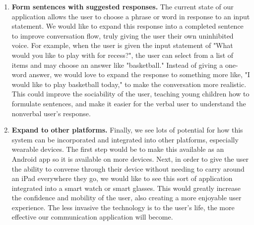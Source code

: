 \begin{enumerate}
	\item \textbf{Form sentences with suggested responses.} The current state of our application allows the user to choose a phrase or word in response to an input statement. We would like to expand this response into a completed sentence to improve conversation flow, truly giving the user their own uninhibited voice. For example, when the user is given the input statement of "What would you like to play with for recess?", the user can select from a list of items and may choose an answer like "basketball." Instead of giving a one-word answer, we would love to expand the response to something more like, "I would like to play basketball today," to make the conversation more realistic. This could improve the sociability of the user, teaching young children how to formulate sentences, and make it easier for the verbal user to understand the nonverbal user's response.
	\item \textbf{Expand to other platforms.} Finally, we see lots of potential for how this system can be incorporated and integrated into other platforms, especially wearable devices. The first step would be to make this available as an Android app so it is available on more devices. Next, in order to give the user the ability to converse through their device without needing to carry around an iPad everywhere they go, we would like to see this sort of application integrated into a smart watch or smart glasses. This would greatly increase the confidence and mobility of the user, also creating a more enjoyable user experience. The less invasive the technology is to the user's life, the more effective our communication application will become.
\end{enumerate}
